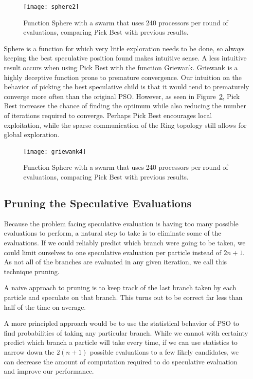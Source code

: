 \documentclass[journal,letterpaper]{IEEEtran}
\newcommand{\fig}[1]{Figure~\ref{fig:#1}}
\begin{document}
\begin{figure}
  \centering
  \texttt{[image: sphere2]}
  \caption{Function Sphere with a swarm that uses 240 processors per round of
  evaluations, comparing Pick Best with previous results.}
  \label{fig:sphere-pickbest}
\end{figure}

Sphere is a function for which very little exploration needs to be done, so
always keeping the best speculative position found makes intuitive sense.  A
less intuitive result occurs when using Pick Best with the function Griewank.
Griewank is a highly deceptive function prone to premature convergence.  Our
intuition on the behavior of picking the best speculative child is that it
would tend to prematurely converge more often than the original PSO.  However,
as seen in \fig{griewank-pickbest}, Pick Best increases the chance of finding
the optimum while also reducing the number of iterations required to converge.
Perhaps Pick Best encourages local exploitation, while the sparse communication
of the Ring topology still allows for global exploration.

\begin{figure}
  \centering
  \texttt{[image: griewank4]}
  \caption{Function Sphere with a swarm that uses 240 processors per round of
  evaluations, comparing Pick Best with previous results.}
  \label{fig:griewank-pickbest}
\end{figure}

\subsection{Pruning the Speculative Evaluations}
\label{sec:pruning}

Because the problem facing speculative evaluation is having too many possible
evaluations to perform, a natural step to take is to eliminate some of the
evaluations.  If we could reliably predict which branch were going to be taken,
we could limit ourselves to one speculative evaluation per particle instead of
$2n+1$.  As not all of the branches are evaluated in any given iteration, we
call this technique pruning.  

A naive approach to pruning is to keep track of the last branch taken by each
particle and speculate on that branch.  This turns out to be correct far less
than half of the time on average.

A more principled approach would be to use the statistical behavior of PSO to
find probabilities of taking any particular branch.  While we cannot with
certainty predict which branch a particle will take every time, if we can use
statistics to narrow down the $2(n+1)$ possible evaluations to a few likely
candidates, we can decrease the amount of computation required to do
speculative evaluation and improve our performance.
\end{document}
